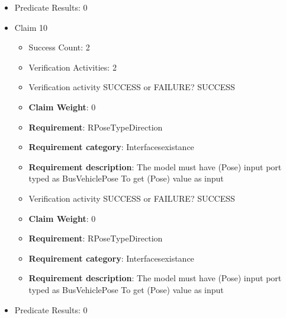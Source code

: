 \documentclass{article}
\begin{document}
\begin{itemize}
\begin{itemize}
					\item Verification activity SUCCESS or FAILURE? SUCCESS
					\item \textbf{Claim Weight}: 0
						\item \textbf{Requirement}: RLateral_VelocityTypeDirection 
						\item \textbf{Requirement category}: Interfacesexistance 
						\item \textbf{Requirement description}: The model must have (lateral velocity) input port typed as double To send (lateral velocity) value as output
					
				\end{itemize}
				
									    
				\item Predicate Results: 0

  				  \item Claim 10
				\begin{itemize}
			    	\item Success Count: 2 
			    	\item Verification Activities: 2
					\item Verification activity SUCCESS or FAILURE? SUCCESS
					\item \textbf{Claim Weight}: 0
						\item \textbf{Requirement}: RPoseTypeDirection 
						\item \textbf{Requirement category}: Interfacesexistance 
						\item \textbf{Requirement description}: The model must have (Pose) input port typed as BusVehiclePose To get (Pose) value as input
					
					\item Verification activity SUCCESS or FAILURE? SUCCESS
					\item \textbf{Claim Weight}: 0
						\item \textbf{Requirement}: RPoseTypeDirection 
						\item \textbf{Requirement category}: Interfacesexistance 
						\item \textbf{Requirement description}: The model must have (Pose) input port typed as BusVehiclePose To get (Pose) value as input
					
				\end{itemize}
				
									    
				\item Predicate Results: 0


\end{itemize}
\end{document}
